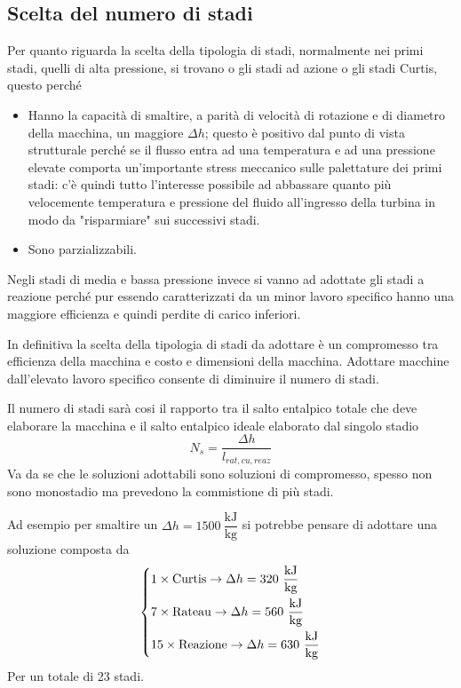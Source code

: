 \documentclass[a4paper, 15pt]{article}
\begin{document}
\subsection{Scelta del numero di stadi}
\begin{adjustwidth}{2in}{}	 
	Per quanto riguarda la scelta della tipologia di stadi, normalmente nei primi stadi, quelli di alta pressione, si trovano o gli stadi ad azione o gli stadi Curtis, questo perché 
	\begin{itemize}
		\item Hanno la capacità di smaltire, a parità di velocità di rotazione e di diametro della macchina, un maggiore $\Delta h$; questo è positivo dal punto di vista strutturale perché se il flusso entra ad una temperatura e ad una pressione elevate comporta un'importante stress meccanico sulle palettature dei primi stadi: c'è quindi tutto l'interesse possibile ad abbassare quanto più velocemente temperatura e pressione del fluido all'ingresso della turbina in modo da "risparmiare" sui successivi stadi. 
		\item Sono parzializzabili. 
	\end{itemize}
	Negli stadi di media e bassa pressione invece si vanno ad adottate gli stadi a reazione perché pur essendo caratterizzati da un minor lavoro specifico hanno una maggiore efficienza e quindi perdite di carico inferiori.
	
	In definitiva la scelta della tipologia di stadi da adottare è un compromesso tra efficienza della macchina e costo e dimensioni della macchina.
	Adottare macchine dall'elevato lavoro specifico consente di diminuire il numero di stadi.
	
	Il numero di stadi sarà cosi il rapporto tra il salto entalpico totale che deve elaborare la macchina e il salto entalpico ideale elaborato dal singolo stadio
	\[N_s = \dfrac{\Delta h}{l_{rat,cu,reaz}}\]
	Va da se che le soluzioni adottabili sono soluzioni di compromesso, spesso non sono monostadio ma prevedono la commistione di più stadi. 
	
	Ad esempio per smaltire un $\Delta h = 1500~\dfrac{\text{kJ}}{\text{kg}}$ si potrebbe pensare di adottare una soluzione composta da 
	\[\begin{dcases}
		1\times\text{Curtis} \rightarrow \Delta h = 320~\dfrac{\text{kJ}}{\text{kg}} \\
		7\times\text{Rateau} \rightarrow \Delta h = 560~\dfrac{\text{kJ}}{\text{kg}} \\
		15\times\text{Reazione} \rightarrow \Delta h = 630~\dfrac{\text{kJ}}{\text{kg}} \\
	\end{dcases}\]
	Per un totale di 23 stadi.
	

\end{adjustwidth}
\end{document}
